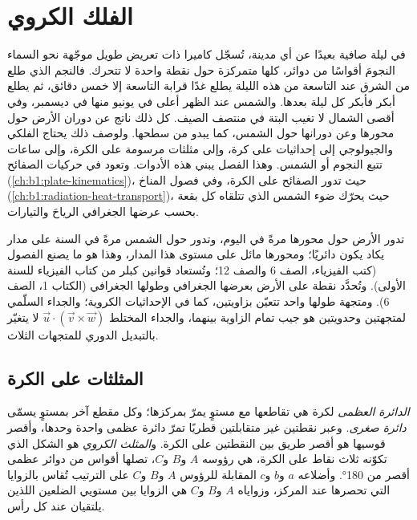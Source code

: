 \chapter{الفلك الكروي}\label{ch:b1:spherical-astronomy}

في ليلة صافية بعيدًا عن أي مدينة، تُسجّل كاميرا ذات تعريض طويل موجّهة نحو السماء النجومَ أقواسًا من دوائر، كلها متمركزة حول نقطة واحدة لا تتحرك. فالنجم الذي طلع من الشرق عند التاسعة من هذه الليلة يطلع غدًا قرابة التاسعة إلا خمس دقائق، ثم يطلع أبكر فأبكر كل ليلة بعدها. والشمس عند الظهر أعلى في يونيو منها في ديسمبر، وفي أقصى الشمال لا تغيب البتة في منتصف الصيف. كل ذلك ناتج عن دوران الأرض حول محورها وعن دورانها حول الشمس، كما يبدو من سطحها. ولوصف ذلك يحتاج الفلكي والجيولوجي إلى إحداثيات على كرة، وإلى مثلثات مرسومة على الكرة، وإلى ساعات تتبع النجوم أو الشمس. وهذا الفصل يبني هذه الأدوات. وتعود في حركيات الصفائح (\cref{ch:b1:plate-kinematics})، حيث تدور الصفائح على الكرة، وفي فصول المناخ (\cref{ch:b1:radiation-heat-transport})، حيث يحرّك ضوء الشمس الذي تتلقاه كل بقعة بحسب عرضها الجغرافي الرياحَ والتيارات.

\begin{recall}
تدور الأرض حول محورها مرةً في اليوم، وتدور حول الشمس مرةً في السنة على مدار يكاد يكون دائريًا؛ ومحورها مائل على مستوى هذا المدار، وهذا  هو ما يصنع الفصول (كتب الفيزياء، الصف 6 والصف 12؛ وتُستعاد قوانين كبلر من كتاب الفيزياء للسنة الأولى). وتُحدَّد نقطة على الأرض بعرضها الجغرافي وطولها الجغرافي (الكتاب 1، الصف 6). ومتجهة طولها واحد تتعيّن بزاويتين، كما في الإحداثيات الكروية؛ والجداء السلّمي لمتجهتين وحدويتين هو جيب تمام الزاوية بينهما، والجداء المختلط $\vec u\cdot(\vec v\times\vec w)$ لا يتغيّر بالتبديل الدوري للمتجهات الثلاث.
\end{recall}

\section{المثلثات على الكرة}

\begin{definition}\label{def:b1:spherical-astronomy:spherical-triangle}
\emph{الدائرة العظمى} لكرة هي تقاطعها مع مستوٍ يمرّ بمركزها؛ وكل مقطع آخر بمستوٍ يسمّى \emph{دائرة صغرى}. وعبر نقطتين غير متقابلتين قطريًا تمرّ دائرة عظمى واحدة وحدها، وأقصر قوسيها هو أقصر طريق بين النقطتين على الكرة. و\emph{المثلث الكروي} هو الشكل الذي تكوّنه ثلاث نقاط على الكرة، هي رؤوسه $A$ و$B$ و$C$، تصلها أقواس من دوائر عظمى أقصر من \ang{180}. وأضلاعه $a$ و$b$ و$c$ المقابلة للرؤوس $A$ و$B$ و$C$ على الترتيب تُقاس بالزوايا التي تحصرها عند المركز، وزواياه $A$ و$B$ و$C$ هي الزوايا بين مستويي الضلعين اللذين يلتقيان عند كل رأس.
\end{definition}

